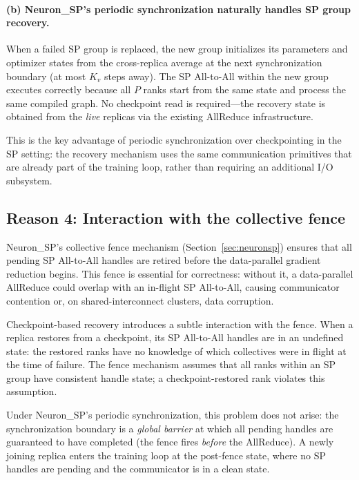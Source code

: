 \documentclass{article}
\begin{document}
\paragraph{(b) Neuron\_SP's periodic synchronization naturally handles
SP group recovery.}
When a failed SP group is replaced, the new group initializes its
parameters and optimizer states from the cross-replica average at the
next synchronization boundary (at most $K_v$ steps away). The SP
All-to-All within the new group executes correctly because all $P$ ranks
start from the same state and process the same compiled graph. No
checkpoint read is required---the recovery state is obtained from the
\emph{live} replicas via the existing AllReduce infrastructure.

This is the key advantage of periodic synchronization over checkpointing
in the SP setting: the recovery mechanism uses the same communication
primitives that are already part of the training loop, rather than
requiring an additional I/O subsystem.

\subsection{Reason 4: Interaction with the collective fence}
\label{sec:checkpoint_fence}

Neuron\_SP's collective fence mechanism
(Section~\ref{sec:neuronsp}) ensures that all pending SP
All-to-All handles are retired before the data-parallel gradient
reduction begins. This fence is essential for correctness: without it,
a data-parallel AllReduce could overlap with an in-flight SP All-to-All,
causing communicator contention or, on shared-interconnect clusters,
data corruption.

Checkpoint-based recovery introduces a subtle interaction with the fence.
When a replica restores from a checkpoint, its SP All-to-All handles are
in an undefined state: the restored ranks have no knowledge of which
collectives were in flight at the time of failure. The fence mechanism
assumes that all ranks within an SP group have consistent handle state;
a checkpoint-restored rank violates this assumption.

Under Neuron\_SP's periodic synchronization, this problem does not arise:
the synchronization boundary is a \emph{global barrier} at which all
pending handles are guaranteed to have completed (the fence fires
\emph{before} the AllReduce). A newly joining replica enters the training
loop at the post-fence state, where no SP handles are pending and the
communicator is in a clean state.
\end{document}
